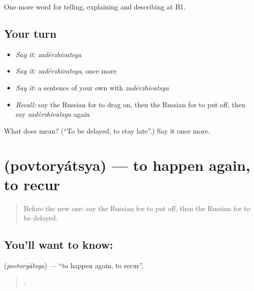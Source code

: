 \begin{grammarlens}[title={What you've built}]
One more word for telling, explaining and describing at B1.
\end{grammarlens}

\subsection*{Your turn}
\begin{itemize}
\raggedright
  \item \emph{Say it:} \emph{zadérzhivatsya}
  \item \emph{Say it:} \emph{zadérzhivatsya}, once more
  \item \emph{Say it:} a sentence of your own with \emph{zadérzhivatsya}
  \item \emph{Recall:} say the Russian for to drag on, then the Russian for to put off, then say \emph{zadérzhivatsya} again
\end{itemize}

\begin{tcolorbox}[breakable,colback=teal!4,colframe=teal!35!black,title={Before you move on}]
What does  mean? (\textquotedblleft{}To be delayed, to stay late\textquotedblright{}.) Say it once more.
\end{tcolorbox}
\section[\texorpdfstring{\ru{повторяться} (povtoryátsya)}{повторяться (povtoryátsya)}]{ (povtoryátsya) — to happen again, to recur}

\label{lesson:RU-C275-povtoryatsya}



\begin{quote}
Before the new one: say the Russian for to put off, then the Russian for to be delayed.
\end{quote}

\subsection*{You'll want to know: }
\textbf{} (\emph{povtoryátsya}) — \textquotedblleft{}to happen again, to recur\textquotedblright{}.

\begin{quote}
    .
\end{quote}

